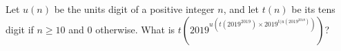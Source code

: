 Let $u(n)$ be the units digit of a positive integer $n$, and let $t(n)$ be its tens digit if $n\ge10$ and $0$ otherwise. What is $\displaystyle t\left(2019^{u(t(2019^{2019}) \times 2019^{t(u(2019^{2018})})}\right)$?
